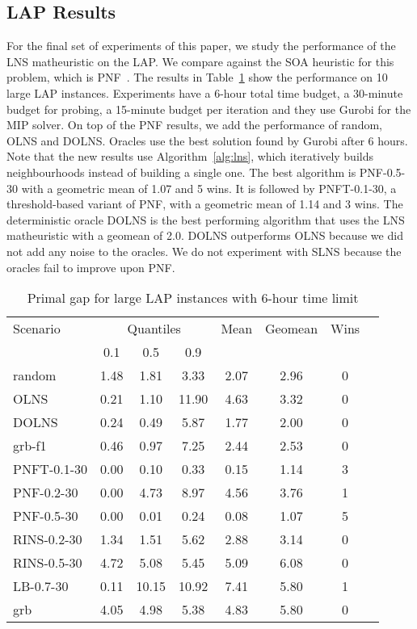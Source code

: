\documentclass[3p, authoryear, times]{elsarticle}
\begin{document}
\subsection{LAP Results} \label{sec:lns:lap_results}

For the final set of experiments of this paper, we study the performance of the LNS matheuristic on the LAP. We compare against the SOA heuristic for this problem, which is PNF~\citep{robinson_la_rocca_one-shot_2024}.  The results in Table~\ref{tab:lns:lap_primal_gap} show the performance on 10 large LAP instances. Experiments have a 6-hour total time budget, a 30-minute budget for probing, a 15-minute budget per iteration and they use Gurobi for the MIP solver.  On top of the PNF results, we add the performance of random, OLNS and DOLNS. Oracles use the best solution found by Gurobi after 6 hours. Note that the new results use Algorithm~\ref{alg:lns}, which iteratively builds neighbourhoods instead of building a single one. The best algorithm is PNF-0.5-30 with a geometric mean of 1.07 and 5 wins. It is followed by PNFT-0.1-30, a threshold-based variant of PNF, with a geometric mean of 1.14 and 3 wins. The deterministic oracle DOLNS is the best performing algorithm that uses the LNS matheuristic with a geomean of 2.0. DOLNS outperforms OLNS because we did not add any noise to the oracles. We do not experiment with SLNS because the oracles fail to improve upon PNF. 

\begin{table}[h]
\centering
\caption{Primal gap for large LAP instances with 6-hour time limit}
\label{tab:lns:lap_primal_gap}
\begin{tabular}{lccccccc}
\toprule
{Scenario} & \multicolumn{3}{c}{Quantiles} & {Mean} & {Geomean} & {Wins} \\
{} & {0.1} & {0.5} & {0.9} & {} & {} & {} \\
\midrule
random & 1.48 & 1.81 & 3.33 & 2.07 & 2.96 & 0 \\
OLNS & 0.21 & 1.10 & 11.90 & 4.63 & 3.32 & 0 \\
DOLNS & 0.24 & 0.49 & 5.87 & 1.77 & 2.00 & 0 \\
grb-f1 & 0.46 & 0.97 & 7.25 & 2.44 & 2.53 & 0 \\
PNFT-0.1-30 & 0.00 & 0.10 & 0.33 & 0.15 & 1.14 & 3 \\
PNF-0.2-30 & 0.00 & 4.73 & 8.97 & 4.56 & 3.76 & 1 \\
PNF-0.5-30 & 0.00 & 0.01 & 0.24 & 0.08 & 1.07 & 5 \\
RINS-0.2-30 & 1.34 & 1.51 & 5.62 & 2.88 & 3.14 & 0 \\
RINS-0.5-30 & 4.72 & 5.08 & 5.45 & 5.09 & 6.08 & 0 \\
LB-0.7-30 & 0.11 & 10.15 & 10.92 & 7.41 & 5.80 & 1 \\
grb & 4.05 & 4.98 & 5.38 & 4.83 & 5.80 & 0 \\
\bottomrule
\end{tabular}
\end{table}
\end{document}
